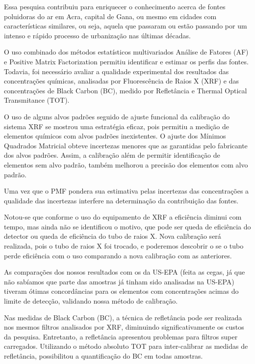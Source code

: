 
Essa pesquisa contribuiu para enriquecer o conhecimento acerca de fontes poluidoras do ar em Acra, capital de Gana, ou mesmo em cidades com características similares, ou seja, aquela que passaram ou estão passando por um intenso e rápido processo de urbanização nas últimas décadas.  

O uso combinado dos  métodos estatísticos multivariados Análise de Fatores (AF) e Positive Matrix Factorization permitiu identificar e estimar os perfis das fontes. Todavia, foi necessário avaliar
a qualidade experimental dos resultados das concentrações químicas, analisadas por Fluorescência de Raios X (XRF) e das concentrações de Black Carbon (BC), medido por Refletância e Thermal Optical Transmitance (TOT). 

O uso de alguns alvos padrões seguido de ajuste funcional da calibração do sistema XRF se mostrou uma estratégia eficaz, pois permitiu a medição de elementos químicos com alvos padrões inexistentes. O ajuste dos Mínimos Quadrados Matricial obteve incertezas menores que as garantidas pelo fabricante dos alvos padrões. Assim, a calibração além de permitir identificação de elementos sem alvo padrão, também melhorou a precisão dos elementos com alvo padrão. 

Uma vez que o PMF pondera sua estimativa pelas incertezas das concentrações a qualidade das incertezas interfere na determinação da contribuição das fontes.

Notou-se que conforme o uso do equipamento de XRF a eficiência diminui com tempo, mas ainda não se identificou o motivo, que pode ser queda de eficiência do detector ou queda de eficiência do tubo de raios X. Nova calibração será realizada, pois o tubo de raios X foi trocado, e poderemos descobrir o se o tubo perde eficiência com o uso comparando a nova calibração com as anteriores. 

As comparações dos nossos resultados com os da US-EPA (feita as cegas, já que não sabíamos que parte das amostras já tinham sido analisadas na US-EPA) tiveram ótimas concordâncias para os elementos com concentrações acimas do limite de detecção, validando nossa método de calibração.   

Nas medidas de Black Carbon (BC), a técnica de refletância pode ser realizada nos mesmos filtros analisados por XRF, diminuindo significativamente os custos da pesquisa. Entretanto, a refletância apresentou problemas para filtros super carregados. Utilizando o método absoluto TOT para inter-calibrar as medidas de refletância, possibilitou a quantificação do BC em todas amostras. 

